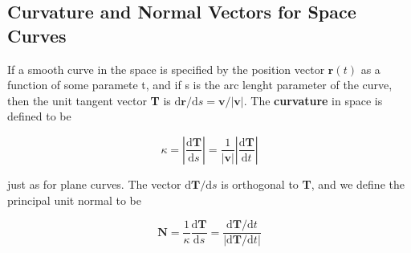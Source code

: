 \documentclass[12pt,a4paper]{article}
\begin{document}
\newpage

\subsection{Curvature and Normal Vectors for Space Curves}

If a smooth curve in the space is specified by the position vector \(\mathbf{r}(t)\) as a function of some paramete t,
and if s is the arc lenght parameter of the curve, then the unit tangent vector \textbf{T} is \(\mathrm{d}\mathbf{r}\slash\mathrm{d}s = \mathbf{v} \slash |\mathbf{v}|\). The \textbf{curvature} in space is defined to be

\[
\kappa = \left| \frac{\mathrm{d}\mathbf{T}}{\mathrm{d}s} \right|  = \frac{1}{|\mathbf{v}|}\left| \frac{\mathrm{d}\mathbf{T}}{\mathrm{d}t}\right|\]

just as for plane curves. The vector \(\mathrm{d}\mathbf{T}\slash\mathrm{d}s\) is orthogonal to \textbf{T}, and we define the principal unit normal to be

\[\mathbf{N} = \frac{1}{\kappa}\frac{\mathrm{d}\mathbf{T}}{\mathrm{d}s} = \frac{\mathrm{d}\mathbf{T}\slash\mathrm{d}t }{\left|\mathrm{d}\mathbf{T}\slash\mathrm{d}t\right|}\]
\end{document}
